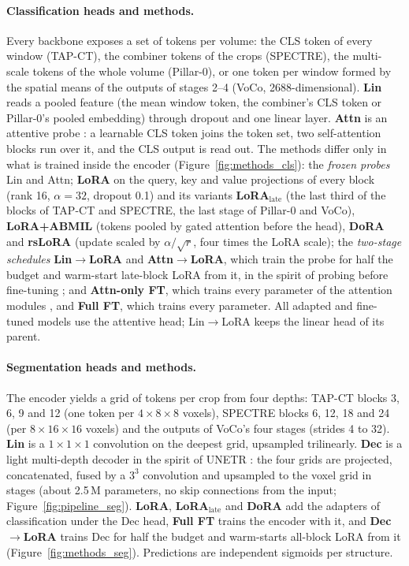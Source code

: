 \paragraph{Classification heads and methods.} Every backbone exposes a set of tokens per volume: the CLS token of every window (TAP-CT), the combiner tokens of the crops (SPECTRE), the multi-scale tokens of the whole volume (Pillar-0), or one token per window formed by the spatial means of the outputs of stages 2--4 (VoCo, 2688-dimensional). \textbf{Lin} reads a pooled feature (the mean window token, the combiner's CLS token or Pillar-0's pooled embedding) through dropout and one linear layer. \textbf{Attn} is an attentive probe \citep{bardes2024vjepa,chen2024cae}: a learnable CLS token joins the token set, two self-attention blocks run over it, and the CLS output is read out. The \numClsMethodsN{} methods differ only in what is trained inside the encoder (Figure~\ref{fig:methods_cls}): the \emph{frozen probes} Lin and Attn; \textbf{LoRA} \citep{hu2022lora} on the query, key and value projections of every block (rank 16, $\alpha=32$, dropout 0.1) and its variants \textbf{LoRA$_{\text{late}}$} (the last third of the blocks of TAP-CT and SPECTRE, the last stage of Pillar-0 and VoCo), \textbf{LoRA+ABMIL} (tokens pooled by gated attention \citep{ilse2018abmil} before the head), \textbf{DoRA} \citep{liu2024dora} and \textbf{rsLoRA} \citep{kalajdzievski2023rslora} (update scaled by $\alpha/\sqrt{r}$, four times the LoRA scale); the \emph{two-stage schedules} \textbf{Lin$\to$LoRA} and \textbf{Attn$\to$LoRA}, which train the probe for half the budget and warm-start late-block LoRA from it, in the spirit of probing before fine-tuning \citep{kumar2022lpft}; and \textbf{Attn-only FT}, which trains every parameter of the attention modules \citep{touvron2022three}, and \textbf{Full FT}, which trains every parameter. All adapted and fine-tuned models use the attentive head; Lin$\to$LoRA keeps the linear head of its parent.

\paragraph{Segmentation heads and methods.} The encoder yields a grid of tokens per crop from four depths: TAP-CT blocks 3, 6, 9 and 12 (one token per $4\times8\times8$ voxels), SPECTRE blocks 6, 12, 18 and 24 (per $8\times16\times16$ voxels) and the outputs of VoCo's four stages (strides 4 to 32). \textbf{Lin} is a $1\times1\times1$ convolution on the deepest grid, upsampled trilinearly. \textbf{Dec} is a light multi-depth decoder in the spirit of UNETR \citep{hatamizadeh2022unetr}: the four grids are projected, concatenated, fused by a $3^3$ convolution and upsampled to the voxel grid in stages (about 2.5\,M parameters, no skip connections from the input; Figure~\ref{fig:pipeline_seg}). \textbf{LoRA}, \textbf{LoRA$_{\text{late}}$} and \textbf{DoRA} add the adapters of classification under the Dec head, \textbf{Full FT} trains the encoder with it, and \textbf{Dec$\to$LoRA} trains Dec for half the budget and warm-starts all-block LoRA from it (Figure~\ref{fig:methods_seg}). Predictions are independent sigmoids per structure.

